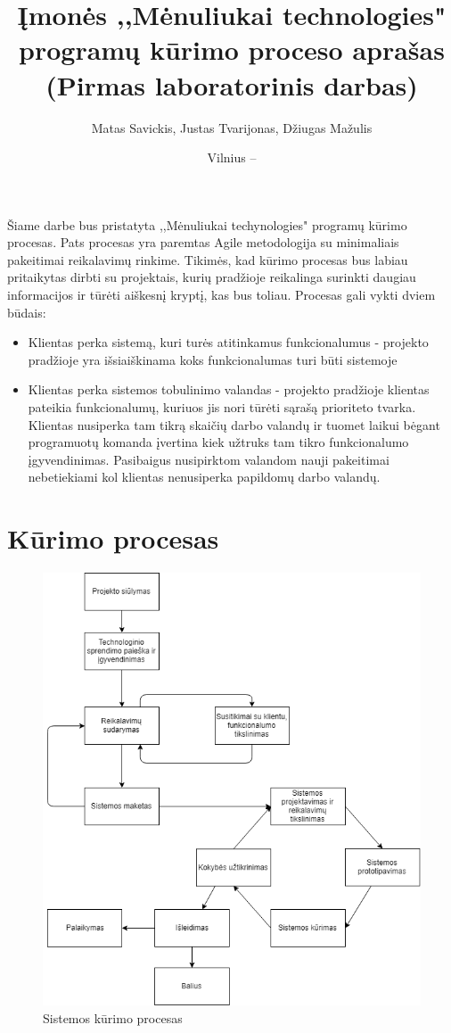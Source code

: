 \documentclass{VUMIFPSkursinis}
\title{Įmonės ,,Mėnuliukai technologies" programų kūrimo proceso aprašas (Pirmas laboratorinis darbas)}
\author{Matas Savickis, Justas Tvarijonas, Džiugas Mažulis}
\date{Vilnius – \the\year}
\begin{document}
\maketitle

\tableofcontents

Šiame darbe bus pristatyta ,,Mėnuliukai techynologies" programų kūrimo procesas. Pats procesas yra paremtas Agile metodologija su minimaliais pakeitimai reikalavimų rinkime. Tikimės, kad kūrimo procesas bus labiau pritaikytas dirbti su projektais, kurių pradžioje reikalinga surinkti daugiau informacijos ir tūrėti aiškesnį kryptį, kas bus toliau. Procesas gali vykti dviem būdais:
\begin{itemize}
	\item{Klientas perka sistemą, kuri turės atitinkamus funkcionalumus - projekto pradžioje yra išsiaiškinama koks funkcionalumas turi būti sistemoje}
	\item{Klientas perka sistemos tobulinimo valandas - projekto pradžioje klientas pateikia funkcionalumų, kuriuos jis nori tūrėti sąrašą prioriteto tvarka. Klientas nusiperka tam tikrą skaičių darbo valandų ir tuomet laikui bėgant programuotų komanda įvertina kiek užtruks tam tikro funkcionalumo įgyvendinimas. Pasibaigus nusipirktom valandom nauji pakeitimai nebetiekiami kol klientas nenusiperka papildomų darbo valandų.}
\end{itemize}
\section{Kūrimo procesas}

	\begin{figure}[H]
	\centering
	\includegraphics[scale=0.7]{img/SoftwareProcessMoonTechnologies}
	\caption{Sistemos kūrimo procesas} %
	\label{img:mlp}
	\end{figure}
\end{document}
